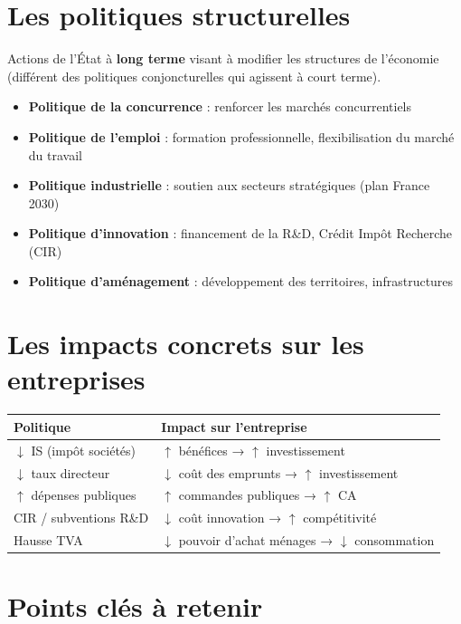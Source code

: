 \documentclass[11pt,a4paper]{article}
\begin{document}
\section*{Les politiques structurelles}
\begin{keybox}
Actions de l'État à \textbf{long terme} visant à modifier les structures de l'économie (différent des politiques conjoncturelles qui agissent à court terme).
\end{keybox}

\begin{itemize}
  \item \textbf{Politique de la concurrence} : renforcer les marchés concurrentiels
  \item \textbf{Politique de l'emploi} : formation professionnelle, flexibilisation du marché du travail
  \item \textbf{Politique industrielle} : soutien aux secteurs stratégiques (plan France 2030)
  \item \textbf{Politique d'innovation} : financement de la R\&D, Crédit Impôt Recherche (CIR)
  \item \textbf{Politique d'aménagement} : développement des territoires, infrastructures
\end{itemize}

\section*{Les impacts concrets sur les entreprises}

\begin{center}
\begin{tabular}{|l|l|}
\hline
\textbf{Politique} & \textbf{Impact sur l'entreprise} \\
\hline
$\downarrow$ IS (impôt sociétés) & $\uparrow$ bénéfices → $\uparrow$ investissement \\
$\downarrow$ taux directeur & $\downarrow$ coût des emprunts → $\uparrow$ investissement \\
$\uparrow$ dépenses publiques & $\uparrow$ commandes publiques → $\uparrow$ CA \\
CIR / subventions R\&D & $\downarrow$ coût innovation → $\uparrow$ compétitivité \\
Hausse TVA & $\downarrow$ pouvoir d'achat ménages → $\downarrow$ consommation \\
\hline
\end{tabular}
\end{center}

\section*{Points clés à retenir}
\end{document}
